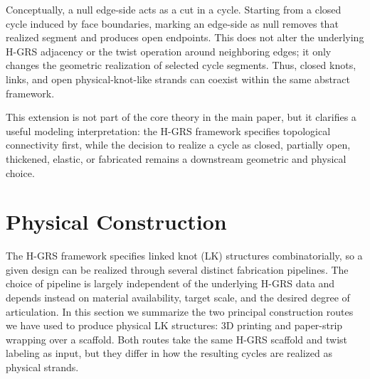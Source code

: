 \documentclass[acmtog,nonacm]{acmart}
\begin{document}
Conceptually, a null edge-side acts as a cut in a cycle. Starting from a closed cycle induced by face boundaries, marking an edge-side as null removes that realized segment and produces open endpoints. This does not alter the underlying H-GRS adjacency or the twist operation around neighboring edges; it only changes the geometric realization of selected cycle segments. Thus, closed knots, links, and open physical-knot-like strands can coexist within the same abstract framework.

This extension is not part of the core theory in the main paper, but it clarifies a useful modeling interpretation: the H-GRS framework specifies topological connectivity first, while the decision to realize a cycle as closed, partially open, thickened, elastic, or fabricated remains a downstream geometric and physical choice.

%

\section{Physical Construction}
\label{sec:physical_construction}

The H-GRS framework specifies linked knot (LK) structures
combinatorially, so a given design can be realized through several
distinct fabrication pipelines. The choice of pipeline is largely
independent of the underlying H-GRS data and depends instead on
material availability, target scale, and the desired degree of
articulation. In this section we summarize the two principal
construction routes we have used to produce physical LK structures:
3D printing and paper-strip wrapping over a scaffold. Both routes
take the same H-GRS scaffold and twist labeling as input, but they
differ in how the resulting cycles are realized as physical strands.
\end{document}
